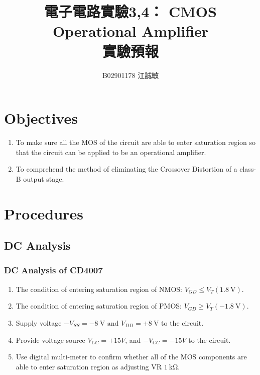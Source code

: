 \documentclass[12pt, a4paper]{article}
\title{ \bf {\huge 電子電路實驗3,4： CMOS Operational Amplifier}\\ 實驗預報}
\author{B02901178 江誠敏}
\begin{document}
\maketitle

\section{Objectives}
\begin{enumerate}
  \item To make sure all the MOS of the circuit are able to enter saturation region
     so that the circuit can be applied to be an operational amplifier. 
  \item To comprehend the method of eliminating the Crossover Distortion of a class-B output stage. 
\end{enumerate}


\section{Procedures}
\subsection{DC Analysis}
\subsubsection{DC Analysis of CD4007}
\begin{enumerate}[itemsep=0pt]
  \item  The condition of entering saturation region of NMOS: 
    $V_{GD} \leq V_T (\SI{1.8}\V)$. 
  \item  The condition of entering saturation region of PMOS: 
    $V_{GD} \geq V_T (\SI{-1.8}\V)$. 
  \item Supply voltage $-V_{SS} = \SI{-8}\V \text{ and } V_{DD} = +\SI{8}\V$ to the circuit.
  \item  Provide voltage source $V_{CC} = +15V$, and $-V_{CC} = −15V$ to the circuit.
  \item Use digital multi-meter to confirm whether all of the MOS components 
    are able to enter saturation region as adjusting VR $\SI{1}\kohm$.
\end{enumerate}
\end{document}

